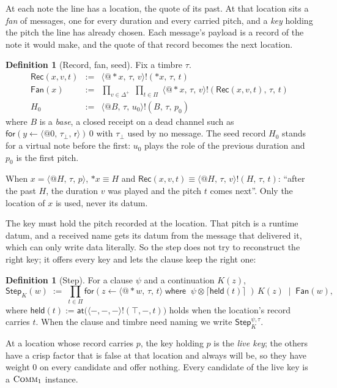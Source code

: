\documentclass[11pt,a4paper]{article}
\makeatletter
\theoremstyle{plain}
\theoremstyle{definition}
\newtheorem{definition}[theorem]{Definition}
\theoremstyle{remark}
\let\oldsc\textsc
\renewcommand{\textsc}[1]{\textup{\oldsc{#1}}}
\newcommand{\scong}{\equiv}
\newcommand{\tensorv}{\otimes}
\newcommand{\crisp}[1]{\lceil #1 \rceil}
\newcommand{\Pit}{\Pi}
\newcommand{\Dur}{\Delta}
\newcommand{\nm}[3]{\langle @#1,\,#2,\,#3\rangle}
\newcommand{\snd}[4]{#1!(#2,\,#3,\,#4)}
\newcommand{\rcv}[3]{\mathsf{for}(#1 \leftarrow #2)\,#3}
\newcommand{\rcvw}[4]{\mathsf{for}(#1 \leftarrow #2 \;\mathsf{where}\; #3)\,#4}
\newcommand{\atm}[1]{\mathsf{#1}}
\newcommand{\Rec}{\mathsf{Rec}}
\newcommand{\Fan}{\mathsf{Fan}}
\newcommand{\drop}{{*}}
\newcommand{\rest}{\mathsf{r}}
\makeatother
\begin{document}
At each note the line has a location, the quote of its past. At that location
sits a \emph{fan} of messages, one for every duration and every carried pitch,
and a \emph{key} holding the pitch the line has already chosen. Each message's
payload is a record of the note it would make, and the quote of that record
becomes the next location.

\begin{definition}[Record, fan, seed]\label{def:voice}
Fix a timbre $\tau$.
\[
\begin{array}{rcl}
\Rec(x, v, t) &:=& \snd{\nm{\drop x}{\tau}{v}}{\drop x}{\tau}{t} \\[4pt]
\Fan(x) &:=& \displaystyle\prod_{v \in \Dur^+}\;\prod_{t \in \Pit}\;
  \snd{\nm{\drop x}{\tau}{v}}{\Rec(x,v,t)}{\tau}{t} \\[10pt]
H_0 &:=& \snd{\nm{B}{\tau}{u_0}}{B}{\tau}{p_0}
\end{array}
\]
where $B$ is a \emph{base}, a closed receipt on a dead channel such as
$\rcv{y}{\nm{0}{\tau_\bot}{\rest}}{0}$ with $\tau_\bot$ used by no message. The
seed record $H_0$ stands for a virtual note before the first: $u_0$ plays the
role of the previous duration and $p_0$ is the first pitch.
\end{definition}

When $x = \nm{H}{\tau}{p}$, $\drop x \scong H$ and
$\Rec(x,v,t) \scong \snd{\nm{H}{\tau}{v}}{H}{\tau}{t}$: ``after the past $H$,
the duration $v$ was played and the pitch $t$ comes next''. Only the location
of $x$ is used, never its datum.

The key must hold the pitch recorded at the location. That pitch is a runtime
datum, and a received name gets its datum from the message that delivered it,
which can only write data literally. So the step does not try to reconstruct the
right key; it offers every key and lets the clause keep the right one:

\begin{definition}[Step]\label{def:step}
For a clause $\psi$ and a continuation $K(z)$,
\[
\mathsf{Step}_K(w) \;:=\; \prod_{t \in \Pit}
  \rcvw{z}{\nm{\drop w}{\tau}{t}}{\;\psi \tensorv \crisp{\atm{held}(t)}\;}{K(z)}
  \;\mid\; \Fan(w),
\]
where $\atm{held}(t) := \atm{at}\big(\langle{-},{-},{-}\rangle!(\top,{-},t)\big)$
holds when the location's record carries $t$. When the clause and timbre need naming we write
$\mathsf{Step}^{\psi,\tau}_K$.
\end{definition}

At a location whose record carries $p$, the key holding $p$ is the \emph{live
key}; the others have a crisp factor that is false at that location and always
will be, so they have weight $0$ on every candidate and offer nothing. Every
candidate of the live key is a $\textsc{Comm}_1$ instance.
\end{document}
